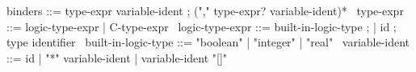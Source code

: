 \begin{syntax}
  binders ::= type-expr variable-ident ;
  ("," type-expr? variable-ident)*
  \
  type-expr ::= logic-type-expr | C-type-expr
  \
  logic-type-expr ::= built-in-logic-type ;
  | id ; type identifier
  \
  built-in-logic-type ::= "boolean" | "integer" | "real" 
  \
  variable-ident ::= id 
  | "*" variable-ident 
  | variable-ident "[]"
\end{syntax}